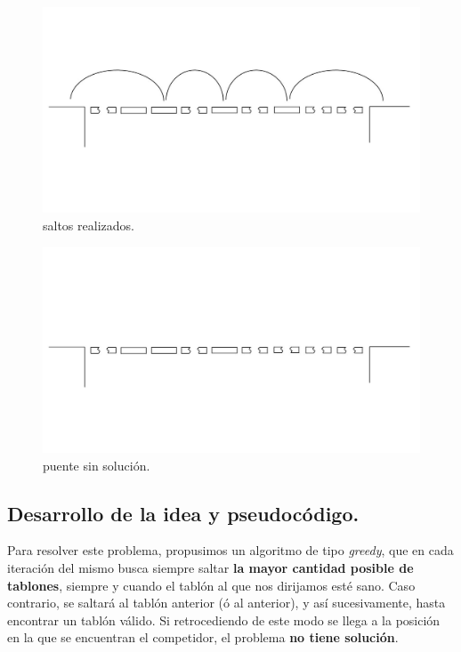 \newpage

\begin{figure}[htb]
  \begin{center}
      \includegraphics[scale=0.25]{imagenes/ej1-puente-saltos.jpg}
  \end{center}
  \caption{saltos realizados.}
\end{figure}


\begin{figure}[htb]
  \begin{center}
      \includegraphics[scale=0.25]{imagenes/ej1-puente-imposible.jpg}
  \end{center}
  \caption{puente sin solución.}
\end{figure}


\newpage
\subsection{Desarrollo de la idea y pseudocódigo.}

\vspace*{0.3cm}

Para resolver este problema, propusimos un algoritmo de tipo \textit{greedy}, que en cada iteración
del mismo busca siempre saltar \textbf{la mayor cantidad posible de tablones}, siempre y cuando el
tablón al que nos dirijamos esté sano. Caso contrario, se saltará al tablón anterior (ó al anterior),
y así sucesivamente, hasta encontrar un tablón válido.
Si retrocediendo de este modo se llega a la posición en la que se encuentran el competidor, el problema
\textbf{no tiene solución}.

